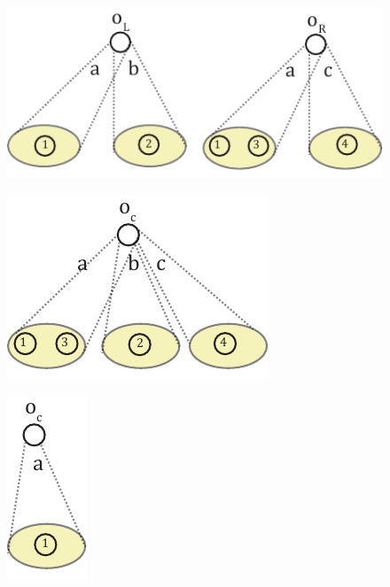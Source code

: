 \begin{figure}[!t]
	\centering
	\begin{minipage}[t]{0.9\textwidth}
		\centering
		\includegraphics[scale=0.8]{fig/05language/03setop_operands.pdf}
		\label{fig:setoperands}
	\end{minipage}
	\begin{minipage}[t]{0.3\textwidth}
		\centering
		\includegraphics[scale=0.8]{fig/05language/04setop_union.pdf}
		\label{fig:setunion}
	\end{minipage}\begin{minipage}[t]{0.3\textwidth}
	\centering
	\includegraphics[scale=0.8]{fig/05language/06setop_intersection.pdf}

\end{minipage}
\end{figure}
